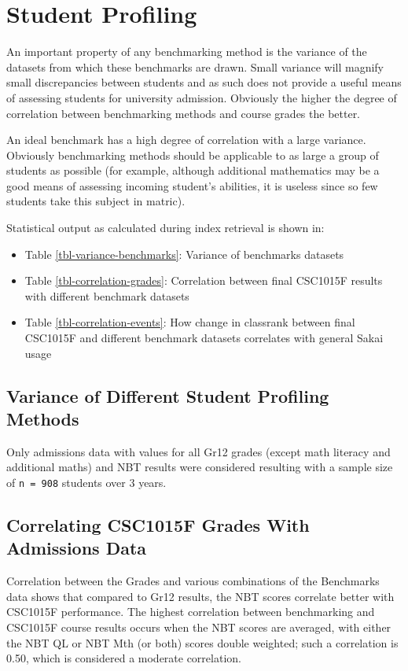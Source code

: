 

\section{Student Profiling}
An important property of any benchmarking method is the variance of the datasets from which these benchmarks are drawn. Small variance will magnify small discrepancies between students and as such does not provide a useful means of assessing students for university admission. Obviously the higher the degree of correlation between benchmarking methods and course grades the better.

An ideal benchmark has a high degree of correlation with a large variance. Obviously benchmarking methods should be applicable to as large a group of students as possible (for example, although additional mathematics may be a good means of assessing incoming student's abilities, it is useless since so few students take this subject in matric).

Statistical output as calculated during index retrieval is shown in:

\begin{itemize}
    \item Table \ref{tbl-variance-benchmarks}: Variance of benchmarks datasets
    \item Table \ref{tbl-correlation-grades}: Correlation between final CSC1015F results with different benchmark datasets
    \item Table \ref{tbl-correlation-events}: How change in classrank between final CSC1015F and different benchmark datasets correlates with general Sakai usage
\end{itemize}





\subsection{Variance of Different Student Profiling Methods}
Only admissions data with values for all Gr12 grades (except math literacy and additional maths) and NBT results were considered resulting with a sample size of \texttt{n = 908} students over 3 years.

\subsection{Correlating CSC1015F Grades With Admissions Data}
Correlation between the Grades and various combinations of the Benchmarks data shows that compared to Gr12 results, the NBT scores correlate better with CSC1015F performance. The highest correlation between benchmarking and CSC1015F course results occurs when the NBT scores are averaged, with either the NBT QL or NBT Mth (or both) scores double weighted; such a correlation is 0.50, which is considered a moderate correlation.

